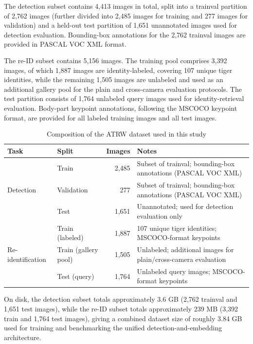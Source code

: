 \documentclass[12pt,a4paper]{article}
\begin{document}
The detection subset contains 4,413 images in total, split into a trainval partition of 2,762 images (further divided into 2,485 images for training and 277 images for validation) and a held-out test partition of 1,651 unannotated images used for detection evaluation. Bounding-box annotations for the 2,762 trainval images are provided in PASCAL VOC XML format.

The re-ID subset contains 5,156 images. The training pool comprises 3,392 images, of which 1,887 images are identity-labeled, covering 107 unique tiger identities, while the remaining 1,505 images are unlabeled and used as an additional gallery pool for the plain and cross-camera evaluation protocols. The test partition consists of 1,764 unlabeled query images used for identity-retrieval evaluation. Body-part keypoint annotations, following the MSCOCO keypoint format, are provided for all labeled training images and all test images.

\captionsetup{justification=justified, singlelinecheck=off,labelfont=bf}
\begin{table}[ht]
    \centering
    \caption{Composition of the ATRW dataset used in this study}
    \label{tb-atrw}
    \begin{tabularx}{\linewidth}{l l r X}
    \hline
    Task & Split & Images & Notes\\
    \hline
     & Train & 2,485 & Subset of trainval; bounding-box annotations (PASCAL VOC XML)\\
    Detection & Validation & 277 & Subset of trainval; bounding-box annotations (PASCAL VOC XML)\\
     & Test & 1,651 & Unannotated; used for detection evaluation only\\
    \hline
     & Train (labeled) & 1,887 & 107 unique tiger identities; MSCOCO-format keypoints\\
    Re-identification & Train (gallery pool) & 1,505 & Unlabeled; additional images for plain/cross-camera evaluation\\
     & Test (query) & 1,764 & Unlabeled query images; MSCOCO-format keypoints\\
    \hline
    \end{tabularx}
\end{table}

On disk, the detection subset totals approximately 3.6 GB (2,762 trainval and 1,651 test images), while the re-ID subset totals approximately 239 MB (3,392 train and 1,764 test images), giving a combined dataset size of roughly 3.84 GB used for training and benchmarking the unified detection-and-embedding architecture.
\end{document}
